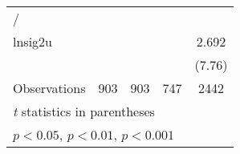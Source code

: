 {\begin{longtable}{l*{4}{c}}
\hline
/               &                  &                  &                  &                  \\
lnsig2u         &                  &                  &                  &    2.692\sym{***}\\
                &                  &                  &                  &   (7.76)         \\
\hline
Observations    &      903         &      903         &      747         &     2442         \\
\hline\hline
\multicolumn{5}{l}{\footnotesize \textit{t} statistics in parentheses}\\
\multicolumn{5}{l}{\footnotesize \sym{*} \(p<0.05\), \sym{**} \(p<0.01\), \sym{***} \(p<0.001\)}\\
\end{longtable}
}
